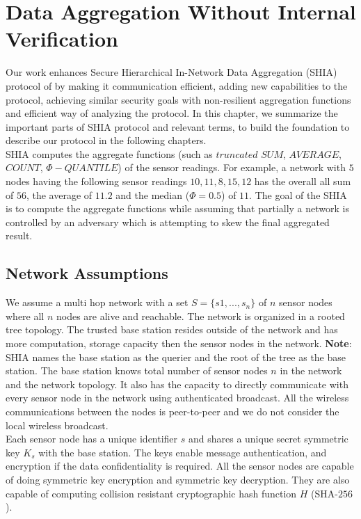 \chapter{Data Aggregation Without Internal Verification} %
\label{cha:Data Aggregation Without Internal Verification}

Our work enhances Secure Hierarchical In-Network Data Aggregation (SHIA) protocol of \cite{chan2006secure} by making it communication efficient, adding new capabilities to the protocol, achieving similar security goals with non-resilient aggregation functions and efficient way of analyzing the protocol.
In this chapter, we summarize the important parts of SHIA protocol and relevant terms, to build the foundation to describe our protocol in the following chapters.\\
SHIA computes the aggregate functions (such as $\textit{truncated SUM}$, $\textit{AVERAGE}$, $\textit{COUNT}$, $\Phi-QUANTILE$) of the sensor readings.
For example, a network with $5$ nodes having the following sensor readings $10,11,8,15,12$ has the overall all sum of $56$, the average of $11.2$ and the median ($\Phi = 0.5$) of $11$.
The goal of the SHIA is to compute the aggregate functions while assuming that partially a network is controlled by an adversary which is attempting to skew the final aggregated result.

\section{Network Assumptions}
	We assume a multi hop network with a set $ S = \{s1,...,s_{n}\} $ of $n$ sensor nodes where all $n$ nodes are alive and reachable. 
	The network is organized in a rooted tree topology.
	The trusted base station resides outside of the network and has more computation, storage capacity then the sensor nodes in the network. 
	\textbf{Note}: SHIA names the base station as the querier and the root of the tree as the base station. 
	The base station knows total number of sensor nodes $n$ in the network and the network topology. 
	It also has the capacity to directly communicate with every sensor node in the network using authenticated broadcast.
	All the wireless communications between the nodes is peer-to-peer and we do not consider the local wireless broadcast.\\
	Each sensor node has a unique identifier $s$ and shares a unique secret symmetric key $K_{s}$ with the base station.
	The keys enable message authentication, and encryption if the data confidentiality is required.
	All the sensor nodes are capable of doing symmetric key encryption and symmetric key decryption.
	They are also capable of computing collision resistant cryptographic hash function $H$ (SHA-$256$)\cite{SHA256}. 

